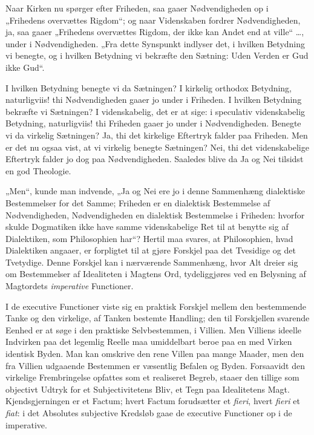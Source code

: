 \documentclass[12pt]{book}
\newcommand{\opage}[1]{\marginnote{\footnotesize\textit{[#1]}}}
\begin{document}
Naar Kirken nu spørger efter Friheden, saa gaaer Nødvendigheden
op i „Frihedens overvættes Rigdom“; og naar
Videnskaben fordrer Nødvendigheden, ja, saa gaaer „Frihedens
overvættes Rigdom, der ikke kan Andet end at ville“ \dots,
under i Nødvendigheden. „Fra dette Synspunkt indlyser det,
\opage{153}i hvilken Betydning vi benegte, og i hvilken Betydning vi
bekræfte den Sætning: Uden Verden er Gud ikke Gud“.

I hvilken Betydning benegte vi da Sætningen? I kirkelig
orthodox Betydning, naturligviis! thi Nødvendigheden
gaaer jo under i Friheden. I hvilken Betydning bekræfte vi
Sætningen? I videnskabelig, det er at sige: i speculativ
videnskabelig Betydning, naturligviis! thi Friheden gaaer jo
under i Nødvendigheden. Benegte vi da virkelig Sætningen?
Ja, thi det kirkelige Eftertryk falder paa Friheden. Men er det
nu ogsaa vist, at vi virkelig benegte Sætningen? Nei, thi det
videnskabelige Eftertryk falder jo dog paa Nødvendigheden.
Saaledes blive da Ja og Nei tilsidst en god Theologie.

„Men“, kunde man indvende, „Ja og Nei ere jo i denne
Sammenhæng dialektiske Bestemmelser for det Samme; Friheden
er en dialektisk Bestemmelse af Nødvendigheden, Nødvendigheden
en dialektisk Bestemmelse i Friheden: hvorfor
skulde Dogmatiken ikke have samme videnskabelige Ret til at
benytte sig af Dialektiken, som Philosophien har“? Hertil
maa svares, at Philosophien, hvad Dialektiken angaaer, er
forpligtet til at gjøre Forskjel paa det Tvesidige og det Tvetydige.
Denne Forskjel kan i nærværende Sammenhæng,
hvor Alt dreier sig om Bestemmelser af Idealiteten i Magtens
Ord, tydeliggjøres ved en Belysning af Magtordets \emph{imperative}
Functioner.

I de executive Functioner viste sig en praktisk Forskjel
mellem den bestemmende Tanke og den virkelige, af Tanken
bestemte Handling; den til Forskjellen svarende Eenhed er at
søge i den praktiske Selvbestemmen, i Villien. Men Villiens
ideelle Indvirken paa det legemlig Reelle maa umiddelbart
beroe paa en med Virken identisk Byden. Man kan omskrive
den rene Villen paa mange Maader, men den fra Villien
udgaaende Bestemmen er væsentlig Befalen og Byden. Forsaavidt
den virkelige Frembringelse opfattes som et realiseret
Begreb, staaer den tillige som objectivt Udtryk for et
Sub\opage{154}jectivitetens Bliv, et Tegn paa Idealitetens Magt. Kjendsgjerningen
er et Factum; hvert Factum forudsætter et \textit{fieri},
hvert \textit{fieri} et \textit{fiat}: i det Absolutes subjective Kredsløb gaae de
executive Functioner op i de imperative.
\end{document}
